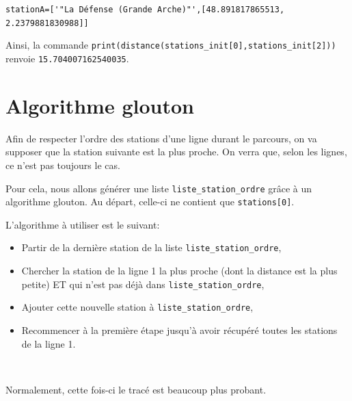 \begin{center}
\verb?stationA=['"La Défense (Grande Arche)"',[48.891817865513, 2.2379881830988]]?
\end{center}

Ainsi, la commande \verb?print(distance(stations_init[0],stations_init[2]))? renvoie \verb?15.704007162540035?.

\section{Algorithme glouton}

Afin de respecter l'ordre des stations d'une ligne durant le parcours, on va supposer que la station suivante est la plus proche. On verra que, selon les lignes, ce n'est pas toujours le cas.

Pour cela, nous allons générer une liste \verb?liste_station_ordre? grâce  à un algorithme glouton. Au départ, celle-ci ne contient que \verb?stations[0]?.

L'algorithme à utiliser est le suivant:
\begin{itemize}
 \item Partir de la dernière station de la liste \verb?liste_station_ordre?,
 \item Chercher la station de la ligne 1 la plus proche (dont la distance est la plus petite) ET qui n'est pas déjà dans \verb?liste_station_ordre?,
 \item Ajouter cette nouvelle station à \verb?liste_station_ordre?,
 \item Recommencer à la première étape jusqu'à avoir récupéré toutes les stations de la ligne 1. 
\end{itemize}


~\

Normalement, cette fois-ci le tracé est beaucoup plus probant.


